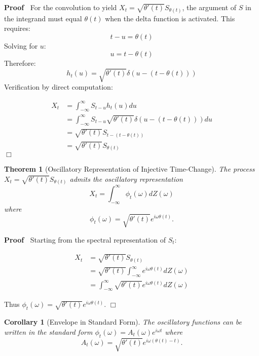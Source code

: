 \documentclass{article}
\newenvironment{proof}{\noindent\textbf{Proof\ }}{\hspace*{\fill}$\Box$\medskip}
\newtheorem{corollary}{Corollary}
\newtheorem{theorem}{Theorem}
\begin{document}
\begin{proof}
  For the convolution to yield $X_t = \sqrt{\theta' (t)} S_{\theta (t)}$, the
  argument of $S$ in the integrand must equal $\theta (t)$ when the delta
  function is activated. This requires:
  \[ t - u = \theta (t) \]
  Solving for $u$:
  \[ u = t - \theta (t) \]
  Therefore:
  \[ h_t (u) = \sqrt{\theta' (t)} \delta (u - (t - \theta (t))) \]
  Verification by direct computation:
  
  \begin{align}
    X_t & = \int_{- \infty}^{\infty} S_{t - u} h_t (u) du \\
    & = \int_{- \infty}^{\infty} S_{t - u}  \sqrt{\theta' (t)} \delta (u - (t
    - \theta (t))) du \\
    & = \sqrt{\theta' (t)} S_{t - (t - \theta (t))} \\
    & = \sqrt{\theta' (t)} S_{\theta (t)} 
  \end{align}
\end{proof}

\begin{theorem}
  [Oscillatory Representation of Injective Time-Change] The process $X_t =
  \sqrt{\theta' (t)} S_{\theta (t)}$ admits the oscillatory representation
  \[ X_t = \int_{- \infty}^{\infty} \phi_t (\omega) dZ (\omega) \]
  where
  \[ \phi_t (\omega) = \sqrt{\theta' (t)} e^{i \omega \theta (t)} . \]
\end{theorem}

\begin{proof}
  Starting from the spectral representation of $S_t$:
  
  \begin{align}
    X_t & = \sqrt{\theta' (t)} S_{\theta (t)} \\
    & = \sqrt{\theta' (t)}  \int_{- \infty}^{\infty} e^{i \omega \theta (t)}
    dZ (\omega) \\
    & = \int_{- \infty}^{\infty} \sqrt{\theta' (t)} e^{i \omega \theta (t)}
    dZ (\omega) 
  \end{align}
  
  Thus $\phi_t (\omega) = \sqrt{\theta' (t)} e^{i \omega \theta (t)}$.
\end{proof}

\begin{corollary}
  [Envelope in Standard Form] The oscillatory functions can be written in the
  standard form $\phi_t (\omega) = A_t (\omega) e^{i \omega t}$ where
  \[ A_t (\omega) = \sqrt{\theta' (t)} e^{i \omega (\theta (t) - t)} . \]
\end{corollary}
\end{document}
